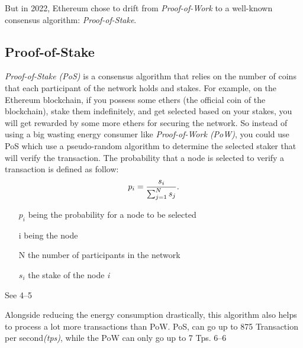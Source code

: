 \documentclass{ifacconf}
\begin{document}
But in 2022, Ethereum chose to drift from \textit{Proof-of-Work} to a  well-known consensus algorithm: \textit{Proof-of-Stake}.

\subsection{Proof-of-Stake}

\textit{Proof-of-Stake (PoS)} is a consensus algorithm that relies on the number of coins that each participant of the network holds and stakes. For example, on the Ethereum blockchain, if you possess some ethers (the official coin of the blockchain), stake them indefinitely, and get selected based on your stakes, you will get rewarded by some more ethers for securing the network. So instead of using a big wasting energy consumer like \textit{Proof-of-Work (PoW)}, you could use PoS which use a pseudo-random algorithm to determine the selected staker that will verify the transaction. The probability that a node is selected to verify a transaction is defined as follow:
\begin{equation} \label{eq:sample}
{p_{i}} = {{s_{i}}\over {\sum_{j=1}^{N} s_{j}}}.
\end{equation}
\begin{itemize}
    \item[$p_{i}$] being the probability for a node to be selected
    \item[i] being the node
    \item[N] the number of participants in the network
    \item[$s_{i}$] the stake of the node \textit{i}
\end{itemize}
See \citep[reference.][]{IEEE2169-3536:19} 4--5

Alongside reducing the energy consumption drastically, this algorithm also helps to process a lot more transactions than PoW. PoS, can go up to 875 Transaction per second\textit{(tps)}, while the PoW can only go up to 7 Tps. \citep[reference.][]{IEEE2169-3536:19} 6--6
\end{document}
